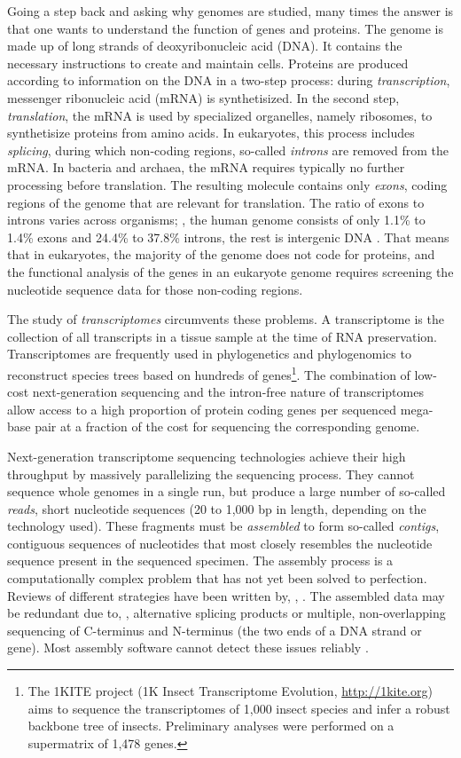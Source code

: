 Going a step back and asking why genomes are studied, many times the answer is
that one wants to understand the function of genes and proteins. The genome is
made up of long strands of deoxyribonucleic acid (DNA). It contains the
necessary instructions to create and maintain cells.  Proteins are produced
according to information on the DNA in a two-step process: during
\emph{transcription}, messenger ribonucleic acid (mRNA) is synthetisized. In the
second step, \emph{translation}, the mRNA is used by specialized organelles,
namely ribosomes, to synthetisize proteins from amino acids. In eukaryotes, this
process includes \emph{splicing}, during which non-coding regions, so-called
\emph{introns} are removed from the mRNA. In bacteria and archaea, the mRNA
requires typically no further processing before translation. The resulting
molecule contains only \emph{exons}, coding regions of the genome that are
relevant for translation. The ratio of exons to introns varies across organisms;
\eg, the human genome consists of only 1.1\% to 1.4\% exons and 24.4\% to
37.8\% introns, the rest is intergenic DNA \citep{venter2001}. That means
that in eukaryotes, the majority of the genome does not code for proteins, and
the functional analysis of the genes in an eukaryote genome requires screening
the nucleotide sequence data for those non-coding regions.

The study of \emph{transcriptomes} circumvents these problems. A transcriptome
is the collection of all transcripts in a tissue sample at the time of RNA
preservation.  Transcriptomes are frequently used in phylogenetics and
phylogenomics to reconstruct species trees based on hundreds of
genes\footnote{The 1KITE project (1K Insect Transcriptome Evolution,
\url{http://1kite.org}) aims to sequence the transcriptomes of 1,000 insect
species and infer a robust backbone tree of insects. Preliminary analyses were
performed on a supermatrix of 1,478 genes.}.  The combination of low-cost
next-generation sequencing and the intron-free nature of transcriptomes allow
access to a high proportion of protein coding genes per sequenced mega-base pair
at a fraction of the cost for sequencing the corresponding genome.

Next-generation transcriptome sequencing technologies achieve their high
throughput by massively parallelizing the sequencing process. They cannot
sequence whole genomes in a single run, but produce a large number of so-called
\emph{reads}, short nucleotide sequences (20 to 1,000 bp in length, depending on
the technology used). These fragments must be \emph{assembled} to form so-called
\emph{contigs}, contiguous sequences of nucleotides that most closely resembles
the nucleotide sequence present in the sequenced specimen. The assembly process
is a computationally complex problem that has not yet been solved to
perfection. Reviews of different strategies have been written by, \eg,
\citet{zhang2011}. The assembled data may be redundant due to, \eg,
alternative splicing products \citep{black2003} or multiple, non-overlapping
sequencing of C-terminus and N-terminus (the two ends of a DNA strand or gene).
Most assembly software cannot detect these issues reliably
\citep{haiminen2011}. 

